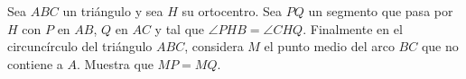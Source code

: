 Sea $ABC$ un triángulo y sea $H$ su ortocentro. Sea $PQ$ un segmento que pasa por $H$ con $P$ en $AB$, $Q$ en $AC$ y tal que $\angle PHB = \angle CHQ$. Finalmente en el circuncírculo del triángulo $ABC$, considera $M$ el punto medio del arco $BC$ que no contiene a $A$. Muestra
que $MP = MQ$.